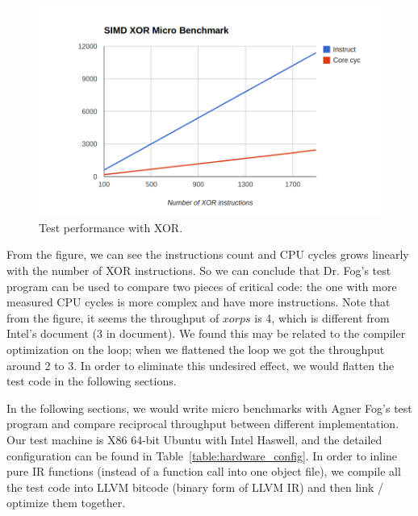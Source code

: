 \begin{figure}[ht!]
\centering
\includegraphics[width=140mm]{draw/testp_xor.png}
\caption[Test Performance with XOR]{Test performance with XOR\@.}
\label{figure:testp_xor}
\end{figure}

From the figure, we can see the instructions count and CPU cycles grows linearly with the number of XOR instructions. So we can conclude that Dr. Fog's test program can be used to compare two pieces of critical code: the one with more measured CPU cycles is more complex and have more instructions. Note that from the figure, it seems the throughput of $xorps$ is 4, which is different from Intel's document (3 in document). We found this may be related to the compiler optimization on the loop; when we flattened the loop we got the throughput around 2 to 3. In order to eliminate this undesired effect, we would flatten the test code in the following sections.

In the following sections, we would write micro benchmarks with Agner Fog's test program and compare reciprocal throughput between different implementation. Our test machine is X86 64-bit Ubuntu with Intel Haswell, and the detailed configuration can be found in Table~\ref{table:hardware_config}. In order to inline pure IR functions (instead of a function call into one object file), we compile all the test code into LLVM bitcode (binary form of LLVM IR) and then link / optimize them together.

